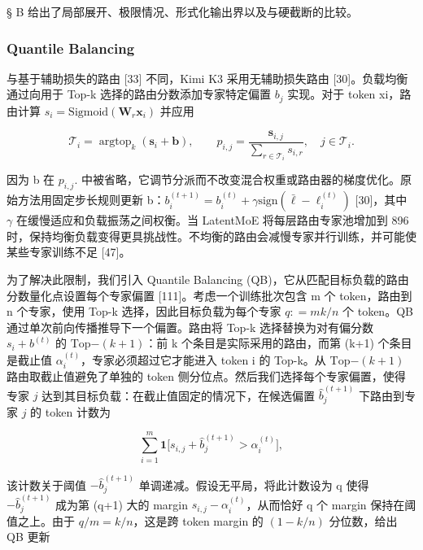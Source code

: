 \documentclass[
  10
]{article}
\begin{document}
§ B 给出了局部展开、极限情况、形式化输出界以及与硬截断的比较。

\subsubsection{Quantile Balancing}\label{quantile-balancing}

与基于辅助损失的路由 {[}33{]} 不同，Kimi K3 采用无辅助损失路由 {[}30{]}。负载均衡通过向用于 Top-k 选择的路由分数添加专家特定偏置 \(b _ { j }\) 实现。对于 token xi，路由计算 \(s _ { i } = \mathrm { S i g m o i d } ( \mathbf { W } _ { r } \mathbf { x } _ { i } )\) 并应用

\[
\mathcal {T} _ {i} = \operatorname{argtop} _ {k} (\boldsymbol {s} _ {i} + \boldsymbol {b}), \qquad p _ {i, j} = \frac {\boldsymbol {s} _ {i , j}}{\sum_ {r \in \mathcal {T} _ {i}} s _ {i , r}}, \quad j \in \mathcal {T} _ {i}.\tag{13}
\]

因为 b 在 \(p _ { i , j } .\) 中被省略，它调节分派而不改变混合权重或路由器的梯度优化。原始方法用固定步长规则更新 b：\(b _ { i } ^ { ( t + 1 ) } = b _ { i } ^ { ( t ) } + \gamma \mathrm { s i g n } ( \bar { \ell } - \ell _ { i } ^ { ( t ) } )\) {[}30{]}，其中 $\gamma$ 在缓慢适应和负载振荡之间权衡。当 LatentMoE 将每层路由专家池增加到 896 时，保持均衡负载变得更具挑战性。不均衡的路由会减慢专家并行训练，并可能使某些专家训练不足 {[}47{]}。

为了解决此限制，我们引入 Quantile Balancing (QB)，它从匹配目标负载的路由分数量化点设置每个专家偏置 {[}111{]}。考虑一个训练批次包含 m 个 token，路由到 n 个专家，使用 Top-k 选择，因此目标负载为每个专家 \(q : = m k / n\) 个 token。QB 通过单次前向传播推导下一个偏置。路由将 Top-k 选择替换为对有偏分数 \(s _ { i } + b ^ { ( t ) }\) 的 \(\mathrm { T o p } \mathrm { - } ( k { + } 1 )\)：前 k 个条目是实际采用的路由，而第 (k+1) 个条目是截止值 \(\alpha _ { i } ^ { ( t ) }\)，专家必须超过它才能进入 token i 的 Top-k。从 \(\mathrm { T o p } \mathrm { - } ( k { + } 1 )\) 路由取截止值避免了单独的 token 侧分位点。然后我们选择每个专家偏置，使得专家 \(j\) 达到其目标负载：在截止值固定的情况下，在候选偏置 \(\widehat { b } _ { j } ^ { ( t + 1 ) }\) 下路由到专家 \(j\) 的 token 计数为

\[
\sum_ {i = 1} ^ {m} \mathbf {1} \Big [ s _ {i, j} + \widehat {b} _ {j} ^ {(t + 1)} > \alpha_ {i} ^ {(t)} \Big ],
\]

该计数关于阈值 \(- \widehat { b } _ { j } ^ { ( t + 1 ) }\) 单调递减。假设无平局，将此计数设为 q 使得 \(- \widehat { b } _ { j } ^ { ( t + 1 ) }\) 成为第 (q+1) 大的 margin \(s _ { i , j } - \alpha _ { i } ^ { ( t ) }\)，从而恰好 q 个 margin 保持在阈值之上。由于 \(q / m = k / n\)，这是跨 token margin 的 \(( 1 - k / n )\) 分位数，给出 QB 更新
\end{document}
